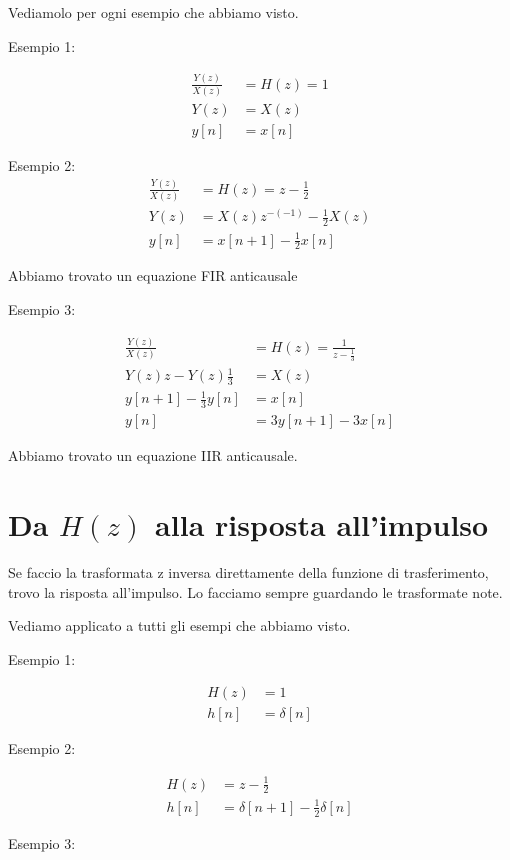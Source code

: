 Vediamolo per ogni esempio che abbiamo visto.

Esempio 1:

\[\begin{split}
    \frac{Y(z)}{X(z)} &= H(z) = 1\\
    Y(z) &= X(z)\\
    y[n] &= x[n]
\end{split}\]

Esempio 2:
\[\begin{split}
    \frac{Y(z)}{X(z)} &= H(z) = z - \frac{1}{2}\\
    Y(z) &= X(z) z^{-(-1)} - \frac{1}{2}X(z)\\
    y[n] &= x[n+1] -\frac{1}{2}x[n]
\end{split}\]

Abbiamo trovato un equazione FIR anticausale

Esempio 3:

\[\begin{split}
    \frac{Y(z)}{X(z)} &= H(z) = \frac{1}{z - \frac{1}{3}}\\
    Y(z) z - Y(z)\frac{1}{3} &= X(z)\\
    y[n+1] - \frac{1}{3}y[n] &= x[n]\\
    y[n] &= 3y[n+1] - 3x[n]
\end{split}\]

Abbiamo trovato un equazione IIR anticausale.

\section{Da $H(z)$ alla risposta all'impulso}
Se faccio la trasformata z inversa direttamente della funzione di trasferimento, trovo la risposta all'impulso. Lo facciamo sempre guardando le trasformate note.

Vediamo applicato a tutti gli esempi che abbiamo visto.

Esempio 1:

\[\begin{split}
    H(z) &= 1\\
    h[n] &= \delta[n]
\end{split}\]

Esempio 2:

\[\begin{split}
    H(z) &= z - \frac{1}{2} \\
    h[n] &= \delta[n + 1] - \frac{1}{2} \delta[n]
\end{split}\]

Esempio 3:

